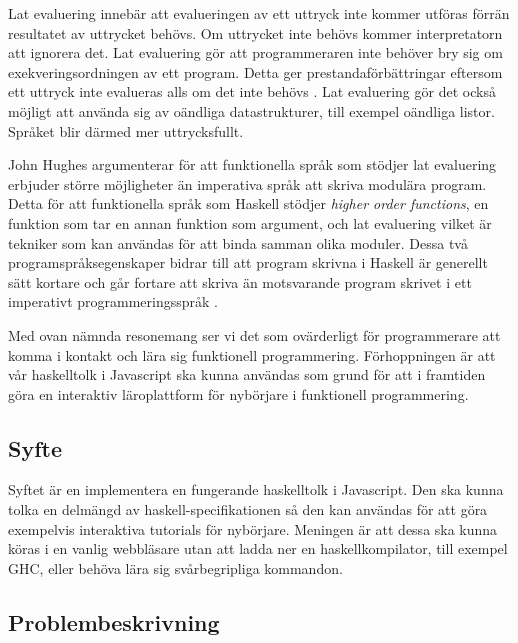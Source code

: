 Lat evaluering innebär att evalueringen av ett uttryck inte kommer utföras förrän resultatet av uttrycket behövs. Om uttrycket inte behövs  kommer interpretatorn att ignorera det. 
Lat evaluering gör att programmeraren inte behöver bry sig om exekveringsordningen av ett program. Detta ger prestandaförbättringar eftersom ett uttryck inte evalueras alls om det inte behövs \citep{hudak89}.
Lat evaluering gör det också möjligt att använda sig av oändliga datastrukturer, till exempel oändliga listor. Språket blir därmed mer uttrycksfullt. 

John Hughes argumenterar för att  funktionella språk som stödjer lat evaluering erbjuder större möjligheter än imperativa språk att skriva modulära program. Detta för att funktionella språk som Haskell stödjer \emph{higher order functions}, en funktion som tar en annan funktion som argument, och lat evaluering vilket är tekniker som kan användas för att binda samman olika moduler.
Dessa två programspråksegenskaper bidrar till att program skrivna i Haskell är generellt sätt kortare och går fortare att skriva än motsvarande program skrivet i ett imperativt programmeringsspråk  \citep{why}.

Med ovan nämnda resonemang ser vi det som ovärderligt för programmerare att komma i kontakt och lära sig funktionell programmering. 
Förhoppningen är att vår haskelltolk i Javascript ska kunna användas som grund för att i framtiden göra en interaktiv läroplattform för nybörjare i funktionell programmering. 


\subsection{Syfte}
Syftet är en implementera en fungerande haskelltolk i Javascript. Den ska kunna tolka en delmängd av haskell-specifikationen så den kan användas för att göra exempelvis interaktiva tutorials för nybörjare.
Meningen är att dessa ska kunna köras i en vanlig webbläsare utan att ladda ner en haskellkompilator, till exempel GHC, eller behöva lära sig svårbegripliga kommandon.

\subsection{Problembeskrivning} 

